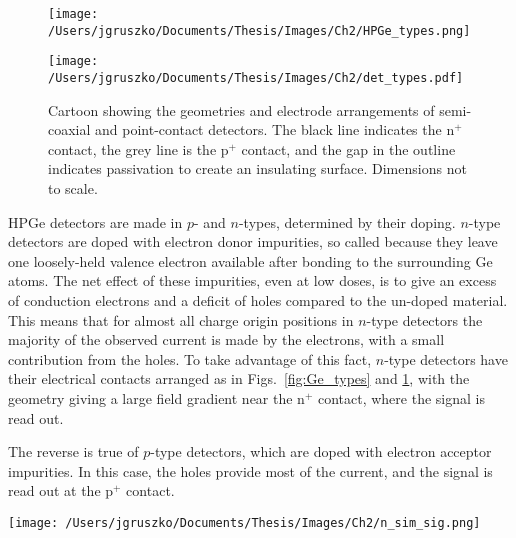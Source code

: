 \begin{figure}[]
 \centering
 \texttt{[image: /Users/jgruszko/Documents/Thesis/Images/Ch2/HPGe\_types.png]}
 \caption[$p$- and $n$-type HPGe detectors]{Diagrams of coaxial detector cross-sections for $p$- \textit{(left)} and $n$- \textit{(right)} type HPGe detectors. From \cite{KnollText}.} 
 \label{fig:Ge_types}

 \centering
 \texttt{[image: /Users/jgruszko/Documents/Thesis/Images/Ch2/det\_types.pdf]}
 \caption[Various geometries of HPGe detectors]{Cartoon showing the geometries and electrode arrangements of semi-coaxial and point-contact detectors. The black line indicates the n$^+$ contact, the grey line is the p$^+$ contact, and the gap in the outline indicates passivation to create an insulating surface. Dimensions not to scale.} 
 \label{fig:det_types}
\end{figure}

HPGe detectors are made in $p$- and $n$-types, determined by their doping. $n$-type detectors are doped with electron donor impurities, so called because they leave one loosely-held valence electron available after bonding to the surrounding Ge atoms. The net effect of these impurities, even at low doses, is to give an excess of conduction electrons and a deficit of holes compared to the un-doped material. This means that for almost all charge origin positions in $n$-type detectors the majority of the observed current is made by the electrons, with a small contribution from the holes. To take advantage of this fact, $n$-type detectors have their electrical contacts arranged as in Figs.~\ref{fig:Ge_types} and \ref{fig:det_types}, with the geometry giving a large field gradient near the n$^+$ contact, where the signal is read out. 

The reverse is true of $p$-type detectors, which are doped with electron acceptor impurities. In this case, the holes provide most of the current, and the signal is read out at the p$^+$ contact. 

\begin{SCfigure}[]
 \centering
 \texttt{[image: /Users/jgruszko/Documents/Thesis/Images/Ch2/n\_sim\_sig.png]}
 \caption[Calculated signals in an $n$-type Ge(Li) detector]{Calculated pulse shapes for several interaction positions in an $n$-type Ge(Li) detector. Three different interactions points are indicated as 0, 1, and 2. From \cite{Gadeken1976}.} 
 \label{fig:n_sim}
\end{SCfigure}

